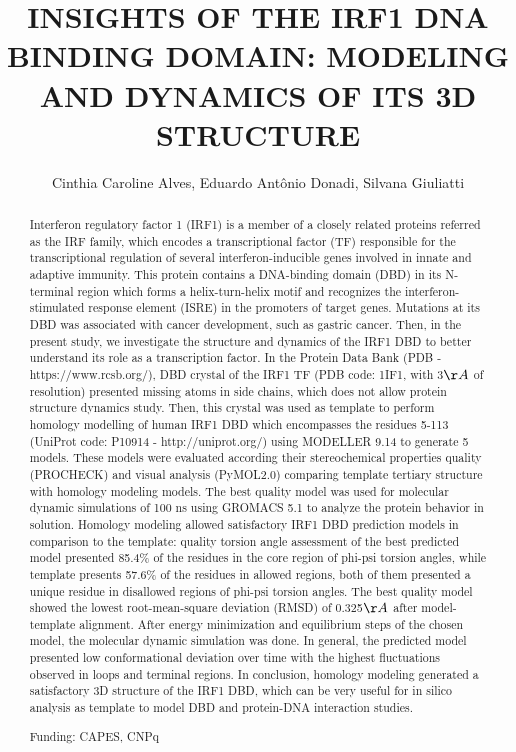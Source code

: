 \documentclass[twoside]{article}
\title{\vspace{-15mm}\fontsize{24pt}{10pt}\selectfont\textbf{ INSIGHTS OF THE IRF1 DNA BINDING DOMAIN: MODELING AND DYNAMICS OF ITS 3D STRUCTURE }} %
\author{ Cinthia Caroline Alves, Eduardo Ant\^onio Donadi, Silvana Giuliatti }
\affil{ Ribeirao Preto Medical School }
\date{}
\begin{document}
  
  
  \maketitle %
  
  
  \thispagestyle{fancy} %
  
  
  \begin{abstract}
  Interferon regulatory factor 1 (IRF1) is a member of a closely related proteins referred as the IRF family,  which encodes a transcriptional factor (TF) responsible for the transcriptional regulation of several interferon-inducible genes involved in innate and adaptive immunity. This protein contains a DNA-binding domain (DBD) in its N-terminal region which forms a helix-turn-helix motif and recognizes the interferon-stimulated response element (ISRE) in the promoters of target genes. Mutations at its DBD was associated with cancer development,  such as gastric cancer. Then,  in the present study,  we investigate the structure and dynamics of the IRF1 DBD to better understand its role as a transcription factor. In the Protein Data Bank (PDB - https://www.rcsb.org/),  DBD crystal of the IRF1 TF (PDB code: 1IF1,  with 3$\AA$ of resolution) presented missing atoms in side chains,  which does not allow protein structure dynamics study. Then,  this crystal was used as template to perform homology modelling of human IRF1 DBD  which encompasses the residues 5-113 (UniProt code: P10914 - http://uniprot.org/) using MODELLER 9.14  to generate 5 models. These models were evaluated according their stereochemical properties quality (PROCHECK) and visual analysis (PyMOL2.0) comparing template tertiary structure with homology modeling models. The best quality model was used for molecular dynamic simulations of 100 ns using GROMACS 5.1 to analyze the protein behavior in solution. Homology modeling allowed satisfactory IRF1 DBD prediction models in comparison to the template: quality torsion angle assessment of the best predicted model presented 85.4\% of the residues in the core region of phi-psi torsion angles,  while template presents 57.6\% of the residues in allowed regions,  both of them presented a unique residue in disallowed regions of phi-psi torsion angles. The best quality model showed the lowest root-mean-square deviation (RMSD) of 0.325$\AA$ after model-template alignment. After energy minimization and equilibrium steps of the chosen model,  the molecular dynamic simulation was done. In general,  the predicted model presented low conformational deviation over time with the highest fluctuations observed in loops and terminal regions. In conclusion,  homology modeling generated a satisfactory 3D structure of the IRF1 DBD,  which can be very useful for in silico analysis as template to model DBD and protein-DNA interaction studies.
  
  Funding: CAPES,  CNPq \\ 
  \end{abstract}
  
\end{document}
